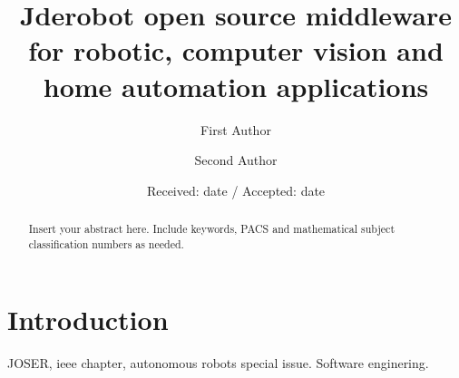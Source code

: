 \documentclass[twocolumn]{svjour3}          %
\begin{document}
\title{Jderobot open source middleware for robotic, computer vision and home automation applications
}


\author{First Author         \and
        Second Author %
}



\date{Received: date / Accepted: date}


\maketitle

\begin{abstract}
Insert your abstract here. Include keywords, PACS and mathematical
subject classification numbers as needed.
\end{abstract}

\section{Introduction}
\label{intro}

JOSER, ieee chapter, autonomous robots special issue. Software enginering.
\end{document}
